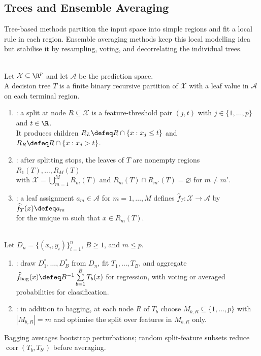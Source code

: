 \subsection{Trees and Ensemble Averaging}

Tree-based methods partition the input space into simple regions and fit a local rule in each region.  Ensemble averaging methods keep this local modelling idea but stabilise it by resampling, voting, and decorrelating the individual trees.

\begin{definition} \label{def:sl-decision-tree} \\
Let $\mathcal{X}\subseteq\R^p$ and let $\mathcal{A}$ be the prediction space.\\
A decision tree $T$ is a finite binary recursive partition of $\mathcal{X}$ with a leaf value in $\mathcal{A}$ on each terminal region.
\begin{enumerate}[label=(\roman*)]
\setlength{\itemsep}{0pt}
\item {}: a split at node $R\subseteq\mathcal{X}$ is a feature-threshold pair $(j,t)$ with $j\in\{1,\ldots,p\}$ and $t\in\R$.\\
It produces children $R_L\defeq R\cap\{x:x_j\leq t\}$ and $R_R\defeq R\cap\{x:x_j>t\}$.
\item {}: after splitting stops, the leaves of $T$ are nonempty regions $R_1(T),\ldots,R_M(T)$\\
with $\mathcal{X}=\bigcup\limits_{m=1}^M R_m(T)$ and $R_m(T)\cap R_{m'}(T)=\varnothing$ for $m\neq m'$.
\item {}: a leaf assignment $a_m\in\mathcal{A}$ for $m=1,\ldots,M$ defines $\widehat{f}_T:\mathcal{X}\to\mathcal{A}$ by $\widehat{f}_T(x)\defeq a_m$\\
for the unique $m$ such that $x\in R_m(T)$.
\end{enumerate}
\end{definition}

\begin{definition} \label{def:sl-bagging-random-forest} \\
Let $D_n=\{(x_i,y_i)\}_{i=1}^n$, $B\geq1$, and $m\leq p$.
\begin{enumerate}[label=(\roman*)]
\setlength{\itemsep}{0pt}
\item {}: draw $D_1^*,\ldots,D_B^*$ from $D_n$, fit $T_1,\ldots,T_B$, and aggregate $\widehat{f}_{\mathrm{bag}}(x)\defeq B^{-1}\sum\limits_{b=1}^B T_b(x)$ for regression, with voting or averaged probabilities for classification.
\item {}: in addition to bagging, at each node $R$ of $T_b$ choose $M_{b,R}\subseteq\{1,\ldots,p\}$ with $|M_{b,R}|=m$ and optimise the split over features in $M_{b,R}$ only.
\end{enumerate}
Bagging averages bootstrap perturbations; random split-feature subsets reduce $\operatorname{corr}(T_b,T_{b'})$ before averaging.
\end{definition}

